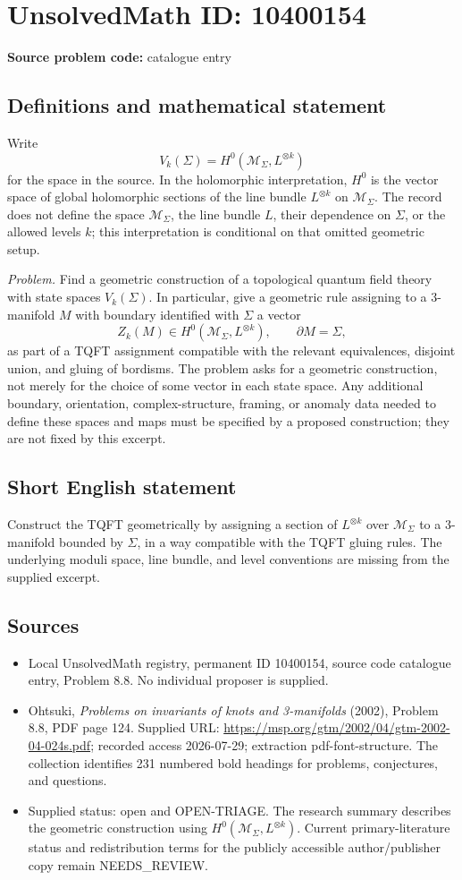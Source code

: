 \documentclass[11pt]{article}
\begin{document}
\section*{UnsolvedMath ID: 10400154}
\textbf{Source problem code:} catalogue entry
\subsection{Definitions and mathematical statement}
Write
\[
 V_k(\Sigma)=H^0\!\left(\mathcal M_\Sigma,L^{\otimes k}\right)
\]
for the space in the source. In the holomorphic interpretation, \(H^0\) is the vector space of global holomorphic sections of the line bundle \(L^{\otimes k}\) on \(\mathcal M_\Sigma\). The record does not define the space \(\mathcal M_\Sigma\), the line bundle \(L\), their dependence on \(\Sigma\), or the allowed levels \(k\); this interpretation is conditional on that omitted geometric setup.

\emph{Problem.} Find a geometric construction of a topological quantum field theory with state spaces \(V_k(\Sigma)\). In particular, give a geometric rule assigning to a \(3\)-manifold \(M\) with boundary identified with \(\Sigma\) a vector
\[
 Z_k(M)\in H^0\!\left(\mathcal M_\Sigma,L^{\otimes k}\right),
 \qquad \partial M=\Sigma,
\]
as part of a TQFT assignment compatible with the relevant equivalences, disjoint union, and gluing of bordisms. The problem asks for a geometric construction, not merely for the choice of some vector in each state space. Any additional boundary, orientation, complex-structure, framing, or anomaly data needed to define these spaces and maps must be specified by a proposed construction; they are not fixed by this excerpt.
\subsection{Short English statement}
Construct the TQFT geometrically by assigning a section of \(L^{\otimes k}\) over \(\mathcal M_\Sigma\) to a \(3\)-manifold bounded by \(\Sigma\), in a way compatible with the TQFT gluing rules. The underlying moduli space, line bundle, and level conventions are missing from the supplied excerpt.
\subsection{Sources}
\begin{itemize}
\item Local UnsolvedMath registry, permanent ID 10400154, source code catalogue entry, Problem 8.8. No individual proposer is supplied.
\item Ohtsuki, \emph{Problems on invariants of knots and 3-manifolds} (2002), Problem 8.8, PDF page 124. Supplied URL: \url{https://msp.org/gtm/2002/04/gtm-2002-04-024s.pdf}; recorded access 2026-07-29; extraction pdf-font-structure. The collection identifies 231 numbered bold headings for problems, conjectures, and questions.
\item Supplied status: open and OPEN-TRIAGE. The research summary describes the geometric construction using \(H^0(\mathcal M_\Sigma,L^{\otimes k})\). Current primary-literature status and redistribution terms for the publicly accessible author/publisher copy remain NEEDS\_REVIEW.
\end{itemize}
\end{document}

